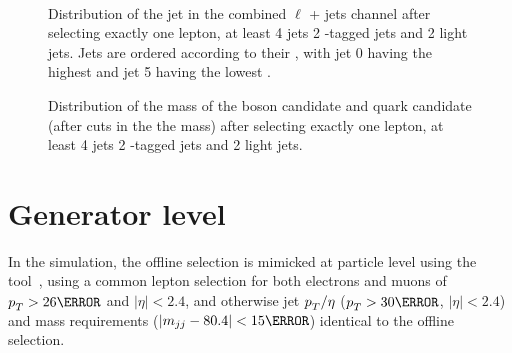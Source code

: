 \begin{figure}[hbtp]
\centering
  \def\twidth{0.32}
  \centering
  \hfill
  \hfill
  \\
    \hfill
  \hfill

\caption{Distribution of the jet \pt in the combined $\ell$ + jets channel after selecting exactly one lepton, at least 4 jets 2 \cPqb-tagged jets and 2 light jets. Jets are ordered according to their \pt, with jet 0 having the highest \pt and jet 5 having the lowest \pt.}
\label{fig:L4_1l4j2b2w_j4pt}
\end{figure}

\begin{figure}[hbtp]
\centering
  \def\twidth{0.32}
  \centering
  \hfil
\caption{Distribution of the mass of the \PW boson candidate and \cPqt quark candidate (after cuts in the the \PW mass) after selecting exactly one lepton, at least 4 jets 2 \cPqb-tagged jets and 2 light jets.}
\label{fig:L4_1l4j2b2w_twcandm}
\end{figure}

\section{Generator level}
\label{sec:generator_level}

In the simulation, the offline selection is mimicked at particle level using the \PSEUDOTOPPRODUCER tool~\cite{code:pseudotop}, using a common lepton selection for both electrons and muons of $\pt>26\GeV$ and $|\eta| < 2.4$, and otherwise jet $p_{T}^{}/\eta$ ($\pt>30\GeV$, $|\eta| < 2.4$) and \PW mass requirements ($\left|m_{jj}-80.4\right|<15\GeV$) identical to the offline selection.

